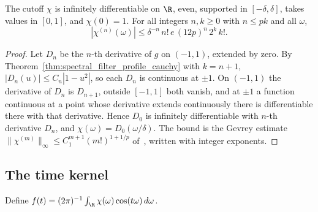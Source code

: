 \begin{theorem}
    \label{thm:spectral_cutoff_smooth}
    \leanok
    The cutoff $\chi$ is infinitely differentiable on $\R$, even, supported
    in $[-\delta,\delta]$, takes values in $[0,1]$, and $\chi(0)=1$. For all
    integers $n,k\ge0$ with $n\le pk$ and all $\omega$,
    \[
        |\chi^{(n)}(\omega)|\le\delta^{-n}\,n!\,e\,(12p)^n\,2^k\,k!.
    \]
\end{theorem}
\begin{proof}\leanok
    Let $D_n$ be the $n$-th derivative of $g$ on $(-1,1)$, extended by zero.
    By Theorem~\ref{thm:spectral_filter_profile_cauchy} with $k=n+1$,
    $|D_n(u)|\le C_n|1-u^2|$, so each $D_n$ is continuous at $\pm1$. On
    $(-1,1)$ the derivative of $D_n$ is $D_{n+1}$, outside $[-1,1]$ both
    vanish, and at $\pm1$ a function continuous at a point whose derivative
    extends continuously there is differentiable there with that derivative.
    Hence $D_0$ is infinitely differentiable with $n$-th derivative $D_n$,
    and $\chi(\omega)=D_0(\omega/\delta)$. The bound is the
    Gevrey estimate $\|\chi^{(m)}\|_\infty\le C_1^{m+1}(m!)^{1+1/p}$
    of~\cite[Lemma~4.2]{OpenAI2026AreaLaw}, written with integer exponents.
\end{proof}

\subsection{The time kernel}
\label{sec:spectral_filter_kernel}

\begin{definition}
    \label{def:spectral_kernel}
    \leanok
    Define $f(t)=(2\pi)^{-1}\int_{\R}\chi(\omega)\cos(t\omega)\,d\omega$.
\end{definition}

